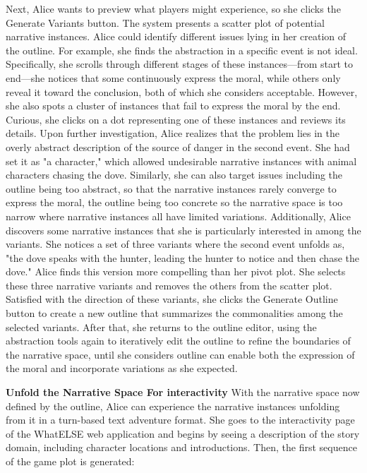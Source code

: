 Next, Alice wants to preview what players might experience, so she clicks the Generate Variants button. The system presents a scatter plot of potential narrative instances. Alice could identify different issues lying in her creation of the outline. For example, she finds the abstraction in a specific event is not ideal. Specifically, she scrolls through different stages of these instances—from start to end—she notices that some continuously express the moral, while others only reveal it toward the conclusion, both of which she considers acceptable. However, she also spots a cluster of instances that fail to express the moral by the end. Curious, she clicks on a dot representing one of these instances and reviews its details. Upon further investigation, Alice realizes that the problem lies in the overly abstract description of the source of danger in the second event. She had set it as "a character," which allowed undesirable narrative instances with animal characters chasing the dove. Similarly, she can also target issues including the outline being too abstract, so that the narrative instances rarely converge to express the moral, the outline being too concrete so the narrative space is too narrow where narrative instances all have limited variations. Additionally, Alice discovers some narrative instances that she is particularly interested in among the variants. She notices a set of three variants where the second event unfolds as, "the dove speaks with the hunter, leading the hunter to notice and then chase the dove." Alice finds this version more compelling than her pivot plot. She selects these three narrative variants and removes the others from the scatter plot. Satisfied with the direction of these variants, she clicks the Generate Outline button to create a new outline that summarizes the commonalities among the selected variants. After that, she returns to the outline editor, using the abstraction tools again to iteratively edit the outline to refine the boundaries of the narrative space, until she considers outline can enable both the expression of the moral and incorporate variations as she expected.

\noindent \textbf{Unfold the Narrative Space For interactivity}
With the narrative space now defined by the outline, Alice can experience the narrative instances unfolding from it in a turn-based text adventure format. She goes to the interactivity page of the WhatELSE web application and begins by seeing a description of the story domain, including character locations and introductions. Then, the first sequence of the game plot is generated:

